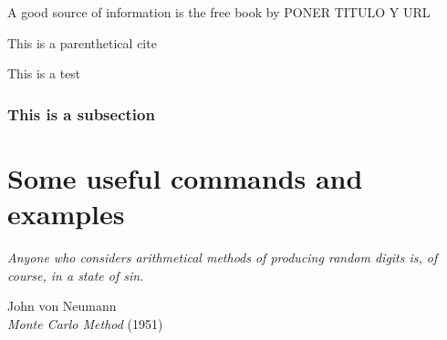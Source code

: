 \documentclass[
documentsize = octavo, %
printmode = true, %
font = cmr, %
typesize = 10, %
fontsize = normalsize, %
onehalfspacing = false, %
language = en, %
degree = phd, %
titlelogo = udc, %
titlepage = true, %
dedication = true, %
preface = true, %
acknowledgements = true, %
abstract-en = true, %
abstract-es = true, %
abstract-ga = true, %
epigraphs = true, %
toc = true, %
lof = true, %
lot = true, %
notation = true, %
biblatex-globalbib = true, %
biblatex-chapterbib = true, %
frontmatterintoc = true, %
printby = true, %
debug = false, %
draft = false, %
showlayout = false, %
]{UDCthesis}
\begin{document}
A good source of information is the free book by \citet{Oetiker2018} PONER TITULO Y URL

This is a parenthetical cite\citep{Oetiker2018}

This is a test \citep{Oetiker2000,Oetiker2001,Oetiker2002,Oetiker2003,Oetiker2004,Oetiker2005,Oetiker2006,Oetiker2007,Oetiker2008,Oetiker2009}

\blindtext[15]


\subsection{This is a subsection}

\chapter{Some useful commands and examples}
\epigraph{\emph{Anyone who considers arithmetical methods of producing random digits is, of course, in a state of sin.}}{John von Neumann\\\emph{Monte Carlo Method} (1951)}

\blindtext[1]
\citep{Oetiker2010,Oetiker2011,Oetiker2012,Oetiker2013,Oetiker2014,Oetiker2015,Oetiker2016,Oetiker2017,Oetiker2018,Oetiker2019}
\citep{Oetiker2020,Oetiker2021,Oetiker2022,Oetiker2023,Oetiker2024,Oetiker2025,Oetiker2026,Oetiker2027,Oetiker2028,Oetiker2029,Oetiker2030,Oetiker2031,Oetiker2032,Oetiker2033,Oetiker2034,Oetiker2035,Oetiker2036,Oetiker2037,Oetiker2038,Oetiker2039}

\blindtext[15]



\end{document}
